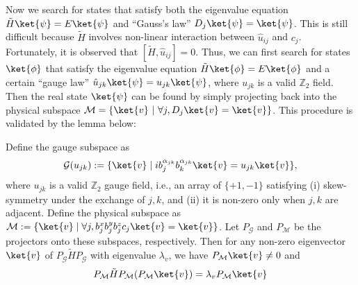 Now we search for states that satisfy both the eigenvalue equation $\tilde H \ket{\psi} = E \ket{\psi}$ and “Gauss's law” $D_j \ket{\psi} = \ket{\psi}$. This is still difficult because $\tilde H$ involves non-linear interaction between $\hat u_{ij}$ and $c_j$. 
Fortunately, it is observed that $[\tilde H, \hat u_{ij}] = 0$. Thus, we can first search for states $\ket{\phi}$ that satisfy the eigenvalue equation $\tilde H \ket{\phi} = E \ket{\phi}$ and a certain “gauge law” $\hat u_{jk} \ket{\psi} = u_{jk}\ket{\psi}$, where $u_{jk}$ is a valid $\mathbb{Z}_2$ field. Then the real state $\ket{\psi}$ can be found by simply projecting back into the physical subspace $\mathcal{M}= \{\ket{v} ~|~\forall j, D_j\ket{v} =  \ket{v}\}$. This procedure is validated by the lemma below:
\begin{lemma}\label{Lemma:gauge}
Define the gauge subspace as
\[
\mathcal{G}(u_{jk}) := \{\ket{v} \mid i b_j^{\alpha_{jk}}b_k^{\alpha_{jk}} \ket{v} = u_{jk}\ket{v}\},
\]
where $u_{jk}$ is a valid $\mathbb{Z}_2$ gauge field, i.e., an array of $\{+1, -1\}$ satisfying (i) skew-symmetry under the exchange of $j,k$, and (ii) it is non-zero only when $j,k$ are adjacent.
Define the physical subspace as $\mathcal{M} := \{\ket{v} \mid \forall j, b_j^x b_j^y b_j^z c_j \ket{v} = \ket{v}\}$.
Let $P_{\mathcal{G}}$ and $P_{\mathcal{M}}$ be the projectors onto these subspaces, respectively.
Then for any non-zero eigenvector $\ket{v}$ of $P_{\mathcal{G}} \tilde{H} P_{\mathcal{G}}$ with eigenvalue $\lambda_v$, we have $P_{\mathcal{M}} \ket{v} \neq 0$ and
\[
P_{\mathcal{M}} \tilde{H} P_{\mathcal{M}} (P_{\mathcal{M}}\ket{v}) = \lambda_v P_{\mathcal{M}}\ket{v}
\]
\end{lemma}

